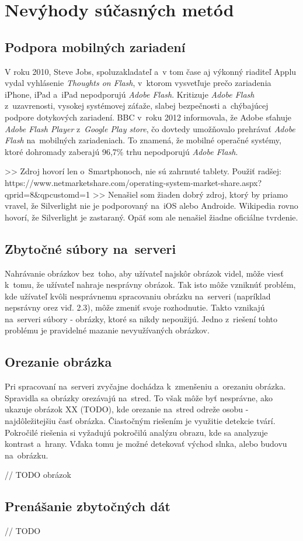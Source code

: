 \chapter{Nevýhody súčasných metód}
\section{Podpora mobilných zariadení}

V roku 2010, Steve Jobs, spoluzakladateľ a~v tom čase aj výkonný riaditeľ Applu vydal vyhlásenie \emph{Thoughts on Flash}\cite{Apple_flash}, v~ktorom vysvetľuje prečo zariadenia iPhone, iPad a~iPad nepodporujú \emph{Adobe Flash}. Kritizuje \emph{Adobe Flash} z~uzavrenosti, vysokej systémovej záťaže, slabej bezpečnosti a~chýbajúcej podpore dotykových zariadení.
BBC v~roku 2012 informovala\cite{Android_flash}, že Adobe sťahuje \emph{Adobe Flash Player} z~\emph{Google Play store}, čo dovtedy umožňovalo prehrávať \emph{Adobe Flash} na~mobilných zariadeniach. To znamená, že mobilné operačné systémy, ktoré dohromady zaberajú 96,7\% trhu\cite{Mobile_OS_share} nepodporujú \emph{Adobe Flash}.


>> Zdroj hovorí len o~Smartphonoch, nie sú zahrnuté tablety. Použiť radšej: https://www.netmarketshare.com/operating-system-market-share.aspx?qprid=8&qpcustomd=1
>> Nenašiel som žiaden dobrý zdroj, ktorý by priamo vravel, že Silverlight nie je podporovaný na~iOS alebo Androide. Wikipedia rovno hovorí, že Silverlight je zastaraný. Opäť som ale nenašiel žiadne oficiálne tvrdenie.


\section{Zbytočné súbory na~serveri}

Nahrávanie obrázkov bez~toho, aby užívateľ najskôr obrázok videl, môže viesť k~tomu, že užívateľ nahraje nesprávny obrázok. Tak isto môže vzniknúť problém, kde užívateľ kvôli nesprávnemu spracovaniu obrázku na~serveri (napríklad nepsrávny orez viď. 2.3), môže zmeniť svoje rozhodnutie. Takto vznikajú na~serveri súbory - obrázky, ktoré sa nikdy nepoužijú. Jedno z~riešení tohto problému je pravidelné mazanie nevyužívaných obrázkov.   

\section{Orezanie obrázka}

Pri spracovaní na~serveri zvyčajne dochádza k~zmenšeniu a~orezaniu obrázka. Spravidla sa obrázky orezávajú na~stred. To však môže byť nesprávne, ako ukazuje obrázok XX (TODO), kde orezanie na~stred odreže osobu - najdôležitejšiu časť obrázka. Čiastočným riešením je využitie detekcie tvárí. Pokročilé riešenia si vyžadujú pokročilú analýzu obrazu, kde sa analyzuje kontrast a~hrany. Vďaka tomu je možné detekovať východ slnka, alebo budovu na~obrázku. 

// TODO obrázok

\section{Prenášanie zbytočných dát}

// TODO